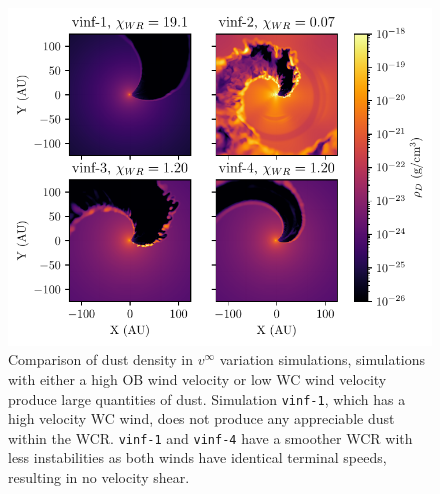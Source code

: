 

\begin{figure}
  \centering
  \includegraphics{assets/results/vinf/vinf-finished-rhod.pdf}
  \caption[Dust density comparison of terminal velocity varying systems]{Comparison of dust density in $v^\infty$ variation simulations, simulations with either a high OB wind velocity or low WC wind velocity produce large quantities of dust. Simulation \texttt{vinf-1}, which has a high velocity WC wind, does not produce any appreciable dust within the WCR. \texttt{vinf-1} and \texttt{vinf-4} have a smoother WCR with less instabilities as both winds have identical terminal speeds, resulting in no velocity shear.}
  \label{fig:vinfrhodcomp}
\end{figure}


